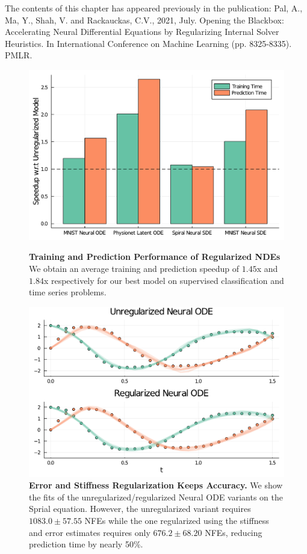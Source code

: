 The contents of this chapter has appeared previously in the publication: Pal, A., Ma, Y., Shah, V. and Rackauckas, C.V., 2021, July. Opening the Blackbox: Accelerating Neural Differential Equations by Regularizing Internal Solver Heuristics. In International Conference on Machine Learning (pp. 8325-8335). PMLR. \citep{pal2021opening}

\begin{figure}[t]
  \centering
  \begin{minipage}[c]{0.49\textwidth}
    \includegraphics[width=\linewidth]{../figures/global_regularization_neural_des/performance_v3.pdf}
    \caption{\textbf{Training and Prediction Performance of Regularized NDEs} We obtain an average training and prediction speedup of $1.45$x and $1.84$x respectively for our best model on supervised classification and time series problems.}
    \label{fig:performance}
  \end{minipage}
  \hfill
  \begin{minipage}[c]{0.49\textwidth}
    \includegraphics[width=\linewidth]{../figures/global_regularization_neural_des/motivation.pdf}
    \caption{\textbf{Error and Stiffness Regularization Keeps Accuracy.} We show the fits of the unregularized/regularized Neural ODE variants on the Sprial equation. However, the unregularized variant requires $1083.0 \pm 57.55$ NFEs while the one regularized using the stiffness and error estimates requires only $676.2 \pm 68.20$ NFEs, reducing prediction time by nearly 50\%.}
    \label{fig:motivation}
  \end{minipage}
\end{figure}

